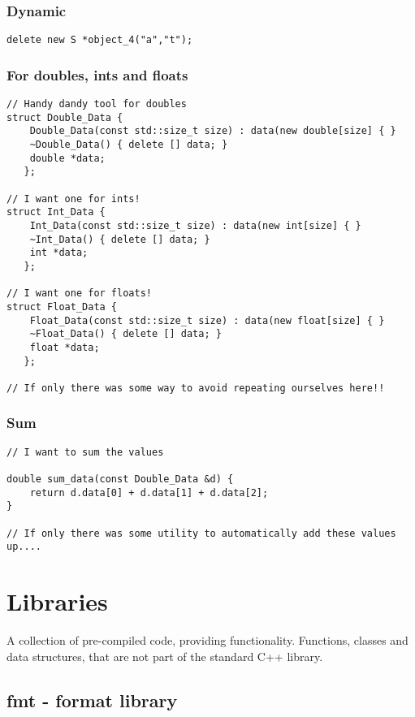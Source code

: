\subsection{Dynamic}

\begin{verbatim}
delete new S *object_4("a","t");
\end{verbatim}


\subsection{For doubles, ints and floats}

\begin{verbatim}
// Handy dandy tool for doubles
struct Double_Data {
    Double_Data(const std::size_t size) : data(new double[size] { }
    ~Double_Data() { delete [] data; }
    double *data;
   };

// I want one for ints!
struct Int_Data {
    Int_Data(const std::size_t size) : data(new int[size] { }
    ~Int_Data() { delete [] data; }
    int *data;
   };

// I want one for floats!
struct Float_Data {
    Float_Data(const std::size_t size) : data(new float[size] { }
    ~Float_Data() { delete [] data; }
    float *data;
   };

// If only there was some way to avoid repeating ourselves here!!
\end{verbatim}

\subsection{Sum}

\begin{verbatim}
// I want to sum the values

double sum_data(const Double_Data &d) {
    return d.data[0] + d.data[1] + d.data[2];
}

// If only there was some utility to automatically add these values up....
\end{verbatim}

\chapter{Libraries}

A collection of pre-compiled code, providing functionality. Functions, classes and data structures,
that are not part of the standard C++ library.

\section{fmt - format library}

